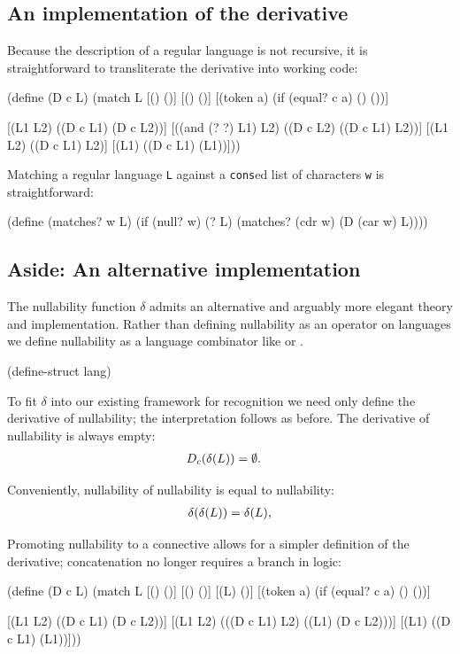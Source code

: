 \subsection{An implementation of the derivative}
Because the description of a regular language is not recursive, it is
straightforward to transliterate the derivative into working code:
\begin{code}
(define (D c L)
  (match L
    [(\ttempty)                     (\ttempty)]
    [(\ttepsilon)                     (\ttempty)]
    [(token a)               (if (equal? c a) (\ttepsilon) (\ttempty))]
    
    [(\ttcup L1 L2)               (\ttcup (D c L1) (D c L2))]
    [(\ttcirc (and (? \ttdelta?) L1) L2)  (\ttcup (D c L2) (\ttcirc (D c L1) L2))]
    [(\ttcirc L1 L2)               (\ttcirc (D c L1) L2)]
    [(\ttstar L1)                  (\ttcirc (D c L1) (\ttstar L1))]))\end{code}
%
%
Matching a regular language {\tt L} against a {\tt cons}ed list of
characters {\tt w} is straightforward:
\begin{code}
(define (matches? w L)
  (if (null? w)
      (\ttdelta? L)
      (matches? (cdr w) (D (car w) L))))\end{code}


\subsection{Aside: An alternative implementation} 
%
The nullability function $\delta$ admits an alternative and arguably more
elegant theory and implementation.
%
Rather than defining nullability as an operator on languages we define
nullability as a language combinator like {\tt \ttcup} or {\tt \ttcirc}.
%
\begin{code}
(define-struct \ttdelta \ttlb{}lang\ttrb)\end{code}
%
To fit $\delta$ into our existing framework for recognition we need only define the
derivative of nullability; the interpretation follows as before.
%
The derivative of nullability is always empty:
%
\begin{align*}
  D_c(\delta(L)) &= \emptyset
  \text.
\end{align*}

Conveniently, nullability of nullability is equal to nullability:
\begin{align*}
 \delta(\delta(L)) = \delta(L)
 \text,
\end{align*}


Promoting nullability to a connective allows for a simpler definition of the
derivative; concatenation no longer requires a branch in logic:
%
\begin{code}
(define (D c L)
  (match L
    [(\ttempty)         (\ttempty)]
    [(\ttepsilon)         (\ttempty)]
    [(\ttdelta L)       (\ttempty)]
    [(token a)    (if (equal? c a) (\ttepsilon) (\ttempty))]

    [(\ttcup L1 L2)   (\ttcup (D c L1) (D c L2))]
    [(\ttcirc L1 L2)   (\ttcup (\ttcirc (D c L1) L2)
                    (\ttcirc (\ttdelta L1) (D c L2)))]
    [(\ttstar L1)      (\ttcirc (D c L1) (\ttstar L1))]))\end{code}


